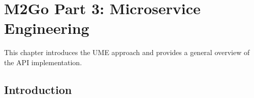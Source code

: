 \chapter{M2Go Part 3: Microservice Engineering}
\label{cha:microservice_engineering}
This chapter introduces the UME approach and provides a general overview of the API implementation.

\section{Introduction}



